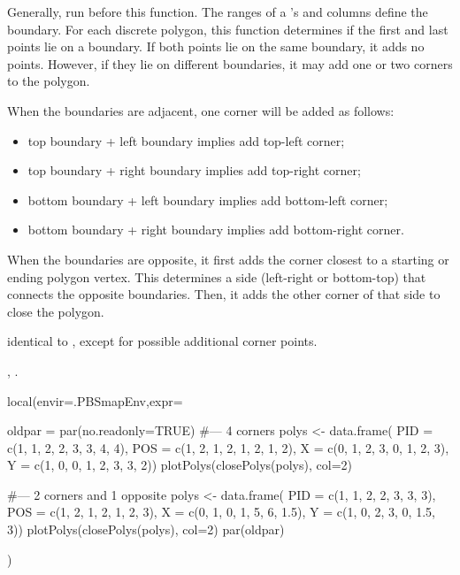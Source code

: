 \documentclass[letterpaper]{book}
\begin{document}
\begin{Details}\relax
Generally, run  before this function. The ranges of a
's  and  columns define the boundary.
For each discrete polygon, this function determines if the first and
last points lie on a boundary.  If both points lie on the same
boundary, it adds no points.  However, if they lie on different
boundaries, it may add one or two corners to the polygon.

When the boundaries are adjacent, one corner will be added as
follows:
\begin{itemize}

\item top boundary + left boundary implies add top-left corner;
\item top boundary + right boundary implies add top-right corner;
\item bottom boundary + left boundary implies add bottom-left
corner;
\item bottom boundary + right boundary implies add bottom-right
corner.

\end{itemize}

When the boundaries are opposite, it first adds the corner closest to
a starting or ending polygon vertex.  This determines a side
(left-right or bottom-top) that connects the opposite boundaries.
Then, it adds the other corner of that side to close the polygon.
\end{Details}
%
\begin{Value}
 identical to , except for possible
additional corner points.
\end{Value}
%
\begin{SeeAlso}\relax
{},
.
\end{SeeAlso}
%
\begin{Examples}
\begin{ExampleCode}
local(envir=.PBSmapEnv,expr={
  oldpar = par(no.readonly=TRUE)
  #--- 4 corners
  polys <- data.frame(
    PID = c(1, 1, 2, 2, 3, 3, 4, 4),
    POS = c(1, 2, 1, 2, 1, 2, 1, 2),
    X   = c(0, 1, 2, 3, 0, 1, 2, 3),
    Y   = c(1, 0, 0, 1, 2, 3, 3, 2))
  plotPolys(closePolys(polys), col=2)

  #--- 2 corners and 1 opposite
  polys <- data.frame(
    PID = c(1, 1, 2, 2, 3, 3, 3),
    POS = c(1, 2, 1, 2, 1, 2, 3),
    X   = c(0, 1, 0, 1, 5, 6, 1.5),
    Y   = c(1, 0, 2, 3, 0, 1.5, 3))
  plotPolys(closePolys(polys), col=2)
  par(oldpar)
})
\end{ExampleCode}
\end{Examples}
\end{document}
